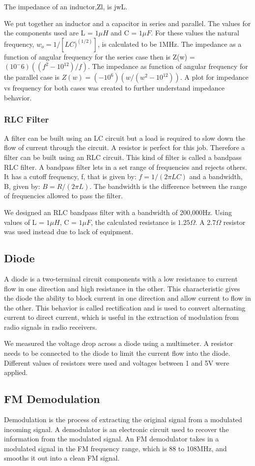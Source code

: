 \documentclass[12pt]{article}
\begin{document}
The impedance of an inductor,Zl, is jwL.

We put together an inductor and a capacitor in series and parallel. The
values for the components used are L = $1\mu H$ and C = $1\mu F$. For these values
the natural frequency, 
$w_o = 1/[LC)^(1/2)]$, is calculated to be 1MHz. The impedance as a
function of angular frequency for the series case then is Z(w) =
$(10^-6)((f^2-10^12)/f)$. The impedance as function of angular frequency
for the parallel case is $Z(w) = (-10^6)(w/(w^2-10^{12}))$. A plot for
impedance vs frequency for both cases was created to further understand
impedance behavior. 

\subsubsection {RLC Filter}

A filter can be built using an LC circuit but a load is required to slow
down the flow of current through the circuit. A resistor is perfect for
this job. Therefore a filter can be built using an RLC circuit. This kind
of filter is called a bandpass RLC filter. A bandpass filter lets in a
set range of frequencies and rejects others. It has a cutoff frequency,
f, that is given by: $f = 1/(2\pi LC)$ and a bandwidth, B, given by: $B =
R/(2\pi L)$. The bandwidth is the difference between the range of
frequencies allowed to pass the filter. 

We designed an RLC bandpass filter with a bandwidth of 200,000Hz. Using values of  
L = $1\mu H$, C = $1\mu F$, the calculated resistance is $1.25\Omega$. A 2.7$\Omega$ resistor
was used instead due to lack of equipment. 

\subsection {Diode}
A diode is a two-terminal circuit components with a low resistance to
current flow in one direction and high resistance in the other. This
characteristic gives the diode the ability to block current in one
direction and allow current to flow in the other. This behavior is
called rectification and is used to convert alternating current to
direct current, which is useful in the extraction of modulation from
radio signals in radio receivers.

We measured the voltage drop across a diode using a multimeter. A
resistor needs to be connected to the diode to limit the current flow
into the diode. Different values of resistors were used and voltages
between 1 and 5V were applied.

\subsection {FM Demodulation}
Demodulation is the process of extracting the original signal from a
modulated incoming signal. A demodulator is an electronic circuit used
to recover the information from the modulated signal. An FM demodulator
takes in a modulated signal in the FM frequency range, which is 88 to
108MHz, and smooths it out into a clean FM signal.
\end{document}
